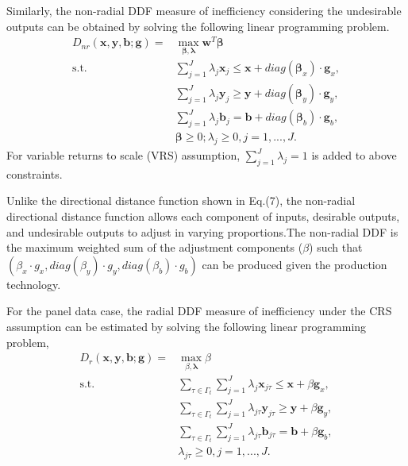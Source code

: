 Similarly, the non-radial DDF measure of inefficiency considering the undesirable outputs can be obtained by solving the following linear programming problem.
\begin{equation}\begin{split}\label{eq_eff_nr}
    D_{nr} (\pmb{x},\pmb{y},\pmb{b};\pmb{g}) 
    = &\max _{\pmb{\beta},\pmb{\lambda}} \pmb{w}^T \pmb{\beta}  \\ 
    \text{s.t.} &\sum\limits_{j = 1}^J {\lambda _j \pmb{x}_j \le \pmb{x} + diag(\pmb{\beta}_x)\cdot \pmb{g}_x}, \\ 
                &\sum\limits_{j = 1}^J {\lambda _j \pmb{y}_j \ge \pmb{y} + diag(\pmb{\beta}_y)\cdot \pmb{g}_y}, \\ 
                &\sum\limits_{j = 1}^J {\lambda _j \pmb{b}_j = \pmb{b} + diag(\pmb{\beta}_b)\cdot \pmb{g}_b}, \\ 
                &\pmb{\beta} \ge 0; \lambda _j \ge 0, j = 1,...,J.
\end{split}\end{equation}
For variable returns to scale (VRS) assumption, $\sum_{j=1}^{J} \lambda_j =1$ is added to above constraints. 

Unlike the directional distance function shown in Eq.(7), the non-radial directional distance function allows each component of inputs, desirable outputs, and undesirable outputs to adjust in varying proportions.The non-radial DDF is the maximum weighted sum of the adjustment components ($\beta$) such that $(\beta_x\cdot g_x,diag(\beta_y)\cdot g_y,diag(\beta_b)\cdot g_b)$ can be produced given the production technology. 


For the panel data case, the radial DDF measure of inefficiency under the CRS assumption can be estimated by solving the following linear programming problem,
\begin{equation}\begin{split}\label{eq_eff_r_panel}
    D_r (\pmb{x},\pmb{y},\pmb{b};\pmb{g}) 
    = &\max _{\beta,\pmb{\lambda}} \beta  \\ 
    \text{s.t.} &\sum\limits_{\tau \in \Gamma_t }\sum\limits_{j = 1}^J {{\lambda _j}{{\pmb{x}}_{j\tau}} \le \pmb{x} + \beta \pmb{g}_x}, \\ 
                &\sum\limits_{\tau \in \Gamma_t }\sum\limits_{j = 1}^J {{\lambda _{j\tau}}{{\pmb{y}}_{j\tau}} \ge \pmb{y} + \beta \pmb{g}_y}, \\ 
                &\sum\limits_{\tau \in \Gamma_t }\sum\limits_{j = 1}^J {{\lambda _{j\tau}}{{\pmb{b}}_{j\tau}} = \pmb{b} + \beta \pmb{g}_b}, \\ 
                &\lambda _{j\tau} \ge 0, j = 1,...,J.
\end{split}\end{equation}

